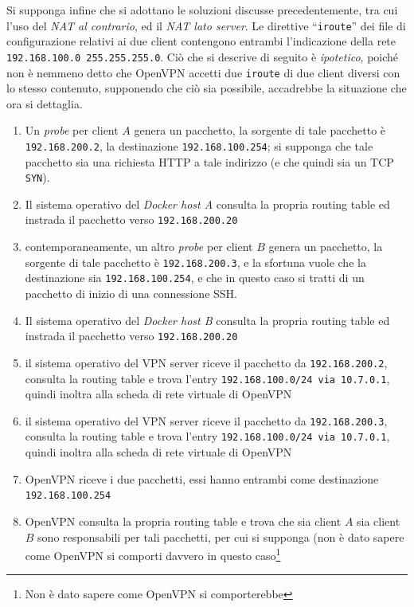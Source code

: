 Si supponga infine che si adottano le soluzioni discusse precedentemente, tra cui
l'uso del \textit{NAT al contrario}, ed il \textit{NAT lato server}. Le direttive
``\texttt{iroute}'' dei file di configurazione relativi ai due client contengono
entrambi l'indicazione della rete \texttt{192.168.100.0 255.255.255.0}.
Ciò che si descrive di seguito è \textit{ipotetico}, poiché non è nemmeno detto che
OpenVPN accetti due \texttt{iroute} di due client diversi con lo stesso contenuto,
supponendo che ciò sia possibile, accadrebbe la situazione che ora si dettaglia.
\begin{enumerate}
  \item Un \textit{probe} per client $A$ genera un pacchetto, la sorgente di tale pacchetto è
  \texttt{192.168.200.2}, la destinazione \texttt{192.168.100.254}; si supponga che
  tale pacchetto sia una richiesta HTTP a tale indirizzo (e che quindi sia un TCP \texttt{SYN}).
  \item Il sistema operativo del \textit{Docker host A} consulta la propria routing table
  ed instrada il pacchetto verso \texttt{192.168.200.20}
  \item contemporaneamente, un altro \textit{probe} per client $B$ genera un pacchetto,
  la sorgente di tale pacchetto è
  \texttt{192.168.200.3}, e la sfortuna vuole che la destinazione sia
  \texttt{192.168.100.254}, e che in questo caso si tratti di un pacchetto  di inizio
  di una connessione SSH.
  \item Il sistema operativo del \textit{Docker host B} consulta la propria routing table
  ed instrada il pacchetto verso \texttt{192.168.200.20}
  \item il sistema operativo del VPN server riceve il pacchetto da \texttt{192.168.200.2},
  consulta la
  routing table e trova l'entry \texttt{192.168.100.0/24 via 10.7.0.1}, quindi inoltra
  alla scheda di rete virtuale di OpenVPN
  \item il sistema operativo del VPN server riceve il pacchetto da \texttt{192.168.200.3},
  consulta la
  routing table e trova l'entry \texttt{192.168.100.0/24 via 10.7.0.1}, quindi inoltra
  alla scheda di rete virtuale di OpenVPN
  \item OpenVPN riceve i due pacchetti,
  essi hanno entrambi come destinazione \texttt{192.168.100.254}
  \item OpenVPN consulta la propria routing table e trova che sia client $A$ sia client $B$
  sono responsabili per tali pacchetti, per cui si supponga (non è dato sapere come OpenVPN
  si comporti davvero in questo caso\footnote{Non è dato sapere come OpenVPN si comporterebbe
}
\end{enumerate}
